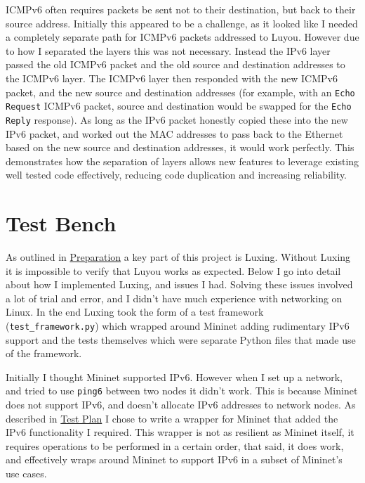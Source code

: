 \documentclass[12pt,a4paper,twoside,openright]{report}
\begin{document}
ICMPv6 often requires packets be sent not to their destination, but back to their source address.  Initially this appeared to be a challenge, as it looked like I needed a completely separate path for ICMPv6 packets addressed to Luyou. However due to how I separated the layers this was not necessary. Instead the IPv6 layer passed the old ICMPv6 packet and the old source and destination addresses to the ICMPv6 layer. The ICMPv6 layer then responded with the new ICMPv6 packet, and the new source and destination addresses (for example, with an \verb!Echo Request! ICMPv6 packet, source and destination would be swapped for the \verb!Echo Reply! response).  As long as the IPv6 packet honestly copied these into the new IPv6 packet, and worked out the MAC addresses to pass back to the Ethernet based on the new source and destination addresses, it would work perfectly. This demonstrates how the separation of layers allows new features to leverage existing well tested code effectively, reducing code duplication and increasing reliability.

\section{Test Bench}

As outlined in \hyperref[chap::preparation]{Preparation} a key part of this project is Luxing. Without Luxing it is impossible to verify that Luyou works as expected.  Below I go into detail about how I implemented Luxing, and issues I had.  Solving these issues involved a lot of trial and error, and I didn't have much experience with networking on Linux.  In the end Luxing took the form of a test framework (\verb!test_framework.py!) which wrapped around Mininet adding rudimentary IPv6 support and the tests themselves which were separate Python files that made use of the framework.

\bigskip

Initially I thought Mininet\cite{mininet} supported IPv6.  However when I set up a network, and tried to use \verb!ping6! between two nodes it didn't work.  This is because Mininet does not support IPv6, and doesn't allocate IPv6 addresses to network nodes.  As described in \hyperref[sec::test_plan]{Test Plan} I chose to write a wrapper for Mininet that added the IPv6 functionality I required.  This wrapper is not as resilient as Mininet itself, it requires operations to be performed in a certain order, that said, it does work, and effectively wraps around Mininet to support IPv6 in a subset of Mininet's use cases.
\end{document}
